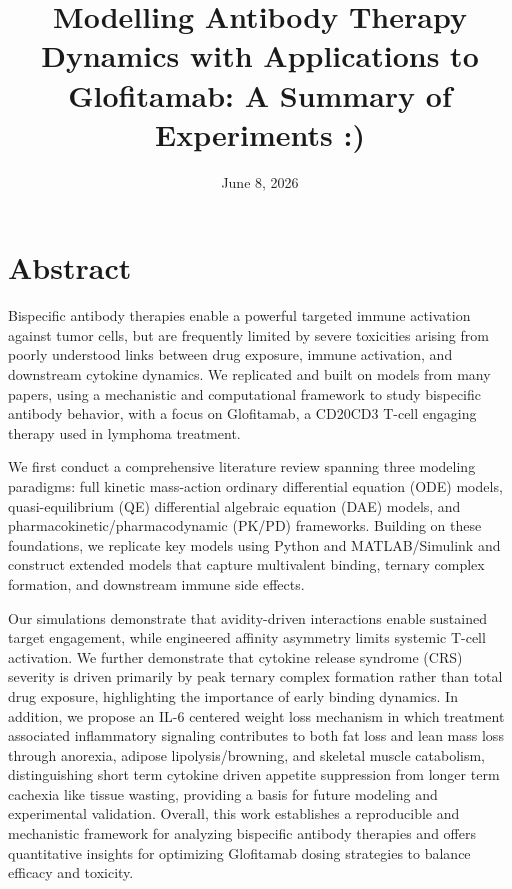 \documentclass[11pt]{article}
\title{Modelling Antibody Therapy Dynamics with Applications to Glofitamab: A Summary of Experiments :)}
\author{}
\date{June 8, 2026}
\begin{document}
\maketitle
\section*{Abstract}

Bispecific antibody therapies enable a powerful targeted immune activation against tumor cells, but are frequently limited by severe toxicities arising from poorly understood links between drug exposure, immune activation, and downstream cytokine dynamics. We replicated and built on models from many papers, using a mechanistic and computational framework to study bispecific antibody behavior, with a focus on Glofitamab, a CD20CD3 T-cell engaging therapy used in lymphoma treatment. 
\par\medskip

We first conduct a comprehensive literature review spanning three modeling paradigms: full kinetic mass-action ordinary differential equation (ODE) models, quasi-equilibrium (QE) differential algebraic equation (DAE) models, and pharmacokinetic/pharmacodynamic (PK/PD) frameworks. Building on these foundations, we replicate key models using Python and MATLAB/Simulink and construct extended models that capture multivalent binding, ternary complex formation, and downstream immune side effects. 
\par\medskip

Our simulations demonstrate that avidity-driven interactions enable sustained target engagement, while engineered affinity asymmetry limits systemic T-cell activation. We further demonstrate that cytokine release syndrome (CRS) severity is driven primarily by peak ternary complex formation rather than total drug exposure, highlighting the importance of early binding dynamics. In addition, we propose an IL-6 centered weight loss mechanism in which treatment associated inflammatory signaling contributes to both fat loss and lean mass loss through anorexia, adipose lipolysis/browning, and skeletal muscle catabolism, distinguishing short term cytokine driven appetite suppression from longer term cachexia like tissue wasting, providing a basis for future modeling and experimental validation. Overall, this work establishes a reproducible and mechanistic framework for analyzing bispecific antibody therapies and offers quantitative insights for optimizing Glofitamab dosing strategies to balance efficacy and toxicity.
\par\medskip
\end{document}
